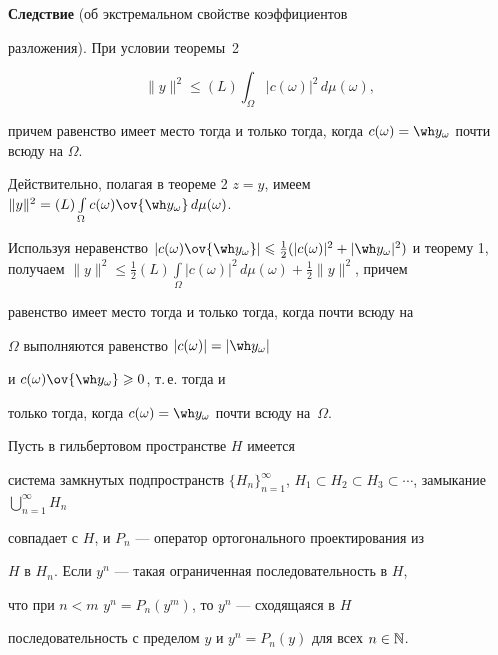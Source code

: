 {\bf Следствие} (об экстремальном свойстве коэффициентов


разложения). При условии теоремы~2


$$


\|y\|^2\leqslant(L)\int_\Omega|c(\omega)|^2\,d\mu(\omega),


$$


причем равенство имеет место тогда и только тогда, когда $c(\omega


)=\wh y_\omega$ почти всюду на $\Omega$.


\medskip





Действительно, полагая в теореме 2\; $z=y$, имеем $\|y\|^2


=(L)\int\limits_\Omega c(\omega)\ov{\wh y_\omega}\,d\mu(\omega)$.


Используя неравенство $|c(\omega)\ov{\wh y_\omega}


|\leqslant\frac12(|c(\omega)|^2+|\wh y_\omega|^2


)$ и теорему 1, получаем $\|y\|^2\leqslant\frac12


(L)\int\limits_\Omega |c(\omega)|^2\,d\mu(\omega)+\frac12\|y\|^2$, причем


равенство имеет место тогда и только тогда, когда почти всюду на


$\Omega$ выполняются равенство $|c(\omega)|=|\wh y_\omega|$


и $c(\omega)\ov {\wh y_\omega}\geqslant0$, т.\,е. тогда и


только тогда, когда $c(\omega)=\wh y_\omega$ почти всюду на~$\Omega$.





\begin{lem}\hspace{-1.8mm}{\bf.}


Пусть в гильбертовом пространстве $H$ имеется


система замкнутых подпространств $\{H_n\}_{n=1}^\infty$, $H_1\subset


H_2\subset H_3\subset\dotsb$, замыкание $\bigcup_{n=1}^\infty H_n$


совпадает с $H$, и $P_n$ --- оператор ортогонального проектирования из


$H$ в $H_n$. Если $y^n$ --- такая ограниченная последовательность в $H$,


что при $n<m$\; $y^n=P_n(y^m)$, то $y^n$ --- сходящаяся в $H$


последовательность с пределом $y$ и $y^n=P_n(y)$ для всех $n\in\Bbb


N$.


\end{lem}





